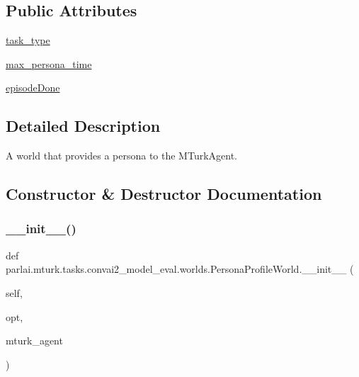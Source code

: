 \subsection*{Public Attributes}
\begin{DoxyCompactItemize}
\item 
\hyperlink{classparlai_1_1mturk_1_1tasks_1_1convai2__model__eval_1_1worlds_1_1PersonaProfileWorld_af482933a082195bce55b2e1aa9acc655}{task\+\_\+type}
\item 
\hyperlink{classparlai_1_1mturk_1_1tasks_1_1convai2__model__eval_1_1worlds_1_1PersonaProfileWorld_a54ca0ba78081ea9c21830464fbefe989}{max\+\_\+persona\+\_\+time}
\item 
\hyperlink{classparlai_1_1mturk_1_1tasks_1_1convai2__model__eval_1_1worlds_1_1PersonaProfileWorld_aa2f2d6ce0bde9d360668fc44378b248b}{episode\+Done}
\end{DoxyCompactItemize}


\subsection{Detailed Description}
\begin{DoxyVerb}A world that provides a persona to the MTurkAgent.
\end{DoxyVerb}
 

\subsection{Constructor \& Destructor Documentation}
\mbox{\label{classparlai_1_1mturk_1_1tasks_1_1convai2__model__eval_1_1worlds_1_1PersonaProfileWorld_ae78876910c6b8572ec62f825015167c1}} 
\subsubsection{\texorpdfstring{\+\_\+\+\_\+init\+\_\+\+\_\+()}{\_\_init\_\_()}}
{\footnotesize\ttfamily def parlai.\+mturk.\+tasks.\+convai2\+\_\+model\+\_\+eval.\+worlds.\+Persona\+Profile\+World.\+\_\+\+\_\+init\+\_\+\+\_\+ (\begin{DoxyParamCaption}\item[{}]{self,  }\item[{}]{opt,  }\item[{}]{mturk\+\_\+agent }\end{DoxyParamCaption})}



